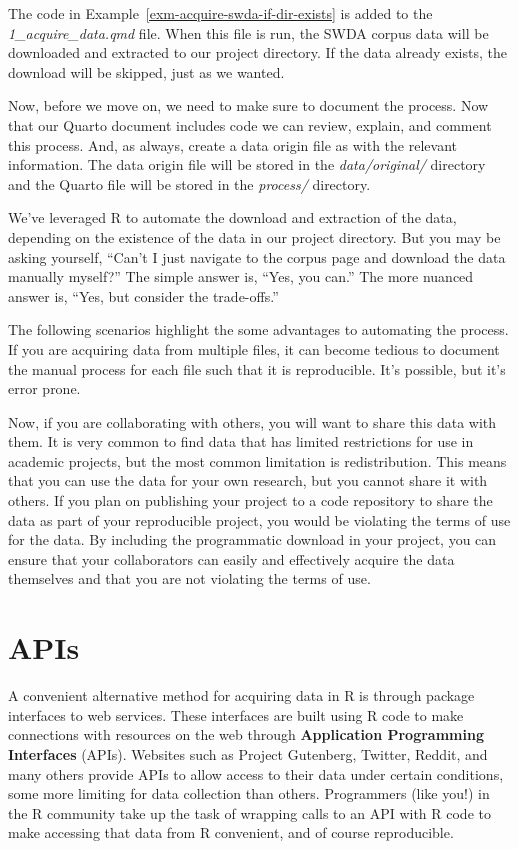 \documentclass[
  letterpaper,
]{book}
\theoremstyle{definition}
\theoremstyle{remark}
\begin{document}
The code in Example~\ref{exm-acquire-swda-if-dir-exists} is added to the
\emph{1\_acquire\_data.qmd} file. When this file is run, the SWDA corpus
data will be downloaded and extracted to our project directory. If the
data already exists, the download will be skipped, just as we wanted.

Now, before we move on, we need to make sure to document the process.
Now that our Quarto document includes code we can review, explain, and
comment this process. And, as always, create a data origin file as with
the relevant information. The data origin file will be stored in the
\emph{data/original/} directory and the Quarto file will be stored in
the \emph{process/} directory.

We've leveraged R to automate the download and extraction of the data,
depending on the existence of the data in our project directory. But you
may be asking yourself, ``Can't I just navigate to the corpus page and
download the data manually myself?'' The simple answer is, ``Yes, you
can.'' The more nuanced answer is, ``Yes, but consider the trade-offs.''

The following scenarios highlight the some advantages to automating the
process. If you are acquiring data from multiple files, it can become
tedious to document the manual process for each file such that it is
reproducible. It's possible, but it's error prone.

Now, if you are collaborating with others, you will want to share this
data with them. It is very common to find data that has limited
restrictions for use in academic projects, but the most common
limitation is redistribution. This means that you can use the data for
your own research, but you cannot share it with others. If you plan on
publishing your project to a code repository to share the data as part
of your reproducible project, you would be violating the terms of use
for the data. By including the programmatic download in your project,
you can ensure that your collaborators can easily and effectively
acquire the data themselves and that you are not violating the terms of
use.

\section{APIs}\label{sec-apis}

A convenient alternative method for acquiring data in R is through
package interfaces to web services. These interfaces are built using R
code to make connections with resources on the web through
\textbf{Application Programming Interfaces} (APIs). Websites such as
Project Gutenberg, Twitter, Reddit, and many others provide APIs to
allow access to their data under certain conditions, some more limiting
for data collection than others. Programmers (like you!) in the R
community take up the task of wrapping calls to an API with R code to
make accessing that data from R convenient, and of course reproducible.
\end{document}
